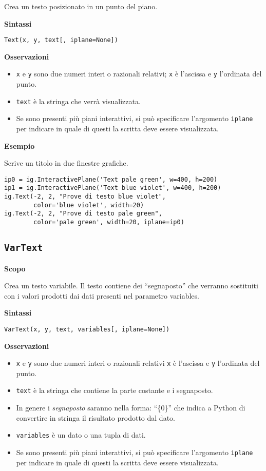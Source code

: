 Crea un testo posizionato in un punto del piano.

\textbf{Sintassi}

\begin{lstlisting}
Text(x, y, text[, iplane=None])
\end{lstlisting}

\textbf{Osservazioni}

\begin{itemize} [noitemsep]
\item \texttt{x} e \texttt{y} sono due numeri interi o razionali relativi; 
\texttt{x} è l'ascissa e \texttt{y} l'ordinata del punto.
\item \texttt{text} è la stringa che verrà visualizzata.
\item Se sono presenti più piani interattivi, si può specificare l'argomento
\texttt{iplane} per indicare in quale di questi la scritta deve essere
visualizzata.
\end{itemize}

\textbf{Esempio}

Scrive un titolo in due finestre grafiche.

\begin{lstlisting}
ip0 = ig.InteractivePlane('Text pale green', w=400, h=200)
ip1 = ig.InteractivePlane('Text blue violet', w=400, h=200)
ig.Text(-2, 2, "Prove di testo blue violet", 
        color='blue violet', width=20)
ig.Text(-2, 2, "Prove di testo pale green", 
        color='pale green', width=20, iplane=ip0)
\end{lstlisting}


\subsection{\texttt{VarText}}
\label{sub:geoint_vartext}
\textbf{Scopo}

Crea un testo variabile. Il testo contiene dei ``segnaposto'' che verranno
sostituiti con i valori prodotti dai dati presenti nel parametro variables.

\textbf{Sintassi}

\begin{lstlisting}
VarText(x, y, text, variables[, iplane=None])
\end{lstlisting}

\textbf{Osservazioni}
\begin{itemize} [noitemsep]
\item \texttt{x} e \texttt{y} sono due numeri interi o razionali relativi 
\texttt{x} è l'ascissa
e \texttt{y} l'ordinata del punto.
\item \texttt{text} è la stringa che contiene la parte costante e i segnaposto.
\item In genere i \emph{segnaposto} saranno nella forma: ``\{0\}'' che indica a 
Python di
convertire in stringa il risultato prodotto dal dato.
\item \texttt{variables} è un dato o una tupla di dati.
\item Se sono presenti più piani interattivi, si può specificare l'argomento
\texttt{iplane} per indicare in quale di questi la scritta deve essere
visualizzata.
\end{itemize}

